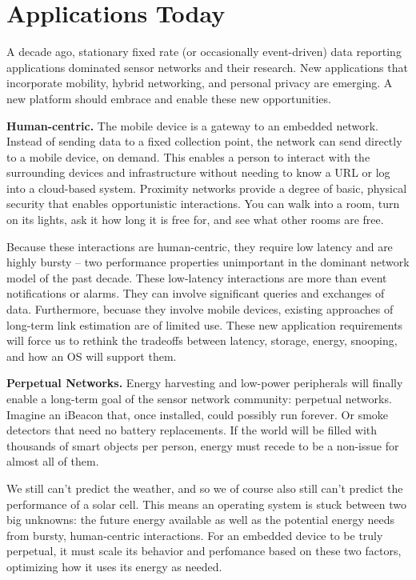 \section{Applications Today}

A decade ago, stationary fixed rate (or occasionally event-driven) data 
reporting applications dominated sensor networks and their research. 
New applications that incorporate mobility, hybrid networking, and 
personal privacy are emerging. A new platform should embrace and enable 
these new opportunities.

\smallskip\noindent
\textbf{Human-centric.}
The mobile device is a gateway to an embedded network. Instead of
sending data to a fixed collection point, the network can send directly
to a mobile device, on demand. This enables a person to interact with
the surrounding devices and infrastructure without needing to know a
URL or log into a cloud-based system. Proximity networks provide a degree
of basic, physical security that enables opportunistic interactions.
You can walk into a room, turn on its lights, ask it how long it is free for,
and see what other rooms are free.

Because these interactions are human-centric, they require low latency and
are highly bursty -- two performance properties unimportant in the
dominant network model of the past decade. These low-latency interactions
are more than event notifications or alarms. They can involve significant
queries and exchanges of data. Furthermore, becuase they involve mobile
devices, existing approaches of long-term link estimation are of limited use.
These new application requirements will force us to rethink the tradeoffs
between latency, storage, energy, snooping, and how an OS will support them.

\smallskip\noindent
\textbf{Perpetual Networks.}
Energy harvesting and low-power peripherals will finally enable a
long-term goal of the sensor network community: perpetual networks. Imagine
an iBeacon that, once installed, could possibly run forever. Or smoke detectors that need no battery replacements. If the world will be filled with
thousands of smart objects per person, energy must recede to be a non-issue
for almost all of them.

We still can't predict the weather, and so we of course also still can't 
predict the performance of a solar cell. This means an operating system
is stuck between two big unknowns: the future energy available as well as
the potential energy needs from bursty, human-centric interactions. For
an embedded device to be truly perpetual, it must scale its behavior and
perfomance based on these two factors, optimizing how it uses its energy
as needed.


